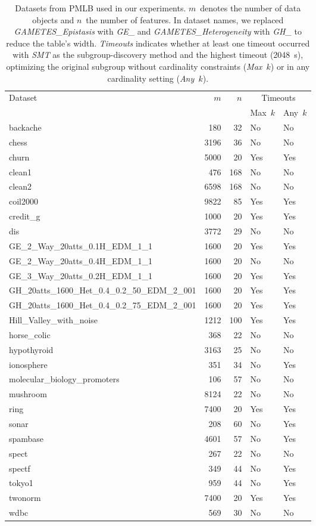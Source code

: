 \documentclass{article}
\theoremstyle{definition}
\begin{document}
\begin{table}[p]
	\centering
	\begin{tabular}{lrrll}
		\toprule
		\multirow{2}{*}{Dataset} & \multirow{2}{*}{$m$} & \multirow{2}{*}{$n$} & \multicolumn{2}{c}{Timeouts} \\
		\cmidrule(lr){4-5}
		& & & Max~$k$ & Any~$k$ \\
		\midrule
		backache & 180 & 32 & No & No \\
		chess & 3196 & 36 & No & No \\
		churn & 5000 & 20 & Yes & Yes \\
		clean1 & 476 & 168 & No & No \\
		clean2 & 6598 & 168 & No & No \\
		coil2000 & 9822 & 85 & Yes & Yes \\
		credit\_g & 1000 & 20 & Yes & Yes \\
		dis & 3772 & 29 & No & No \\
		GE\_2\_Way\_20atts\_0.1H\_EDM\_1\_1 & 1600 & 20 & Yes & Yes \\
		GE\_2\_Way\_20atts\_0.4H\_EDM\_1\_1 & 1600 & 20 & No & No \\
		GE\_3\_Way\_20atts\_0.2H\_EDM\_1\_1 & 1600 & 20 & Yes & Yes \\
		GH\_20atts\_1600\_Het\_0.4\_0.2\_50\_EDM\_2\_001 & 1600 & 20 & Yes & Yes \\
		GH\_20atts\_1600\_Het\_0.4\_0.2\_75\_EDM\_2\_001 & 1600 & 20 & Yes & Yes \\
		Hill\_Valley\_with\_noise & 1212 & 100 & Yes & Yes \\
		horse\_colic & 368 & 22 & No & No \\
		hypothyroid & 3163 & 25 & No & No \\
		ionosphere & 351 & 34 & No & Yes \\
		molecular\_biology\_promoters & 106 & 57 & No & No \\
		mushroom & 8124 & 22 & No & No \\
		ring & 7400 & 20 & Yes & Yes \\
		sonar & 208 & 60 & No & Yes \\
		spambase & 4601 & 57 & No & Yes \\
		spect & 267 & 22 & No & No \\
		spectf & 349 & 44 & No & Yes \\
		tokyo1 & 959 & 44 & No & Yes \\
		twonorm & 7400 & 20 & Yes & Yes \\
		wdbc & 569 & 30 & No & No \\
		\bottomrule
	\end{tabular}
	\caption{
		Datasets from PMLB used in our experiments.
		$m$~denotes the number of data objects and $n$~the number of features.
		In dataset names, we replaced \emph{GAMETES\_Epistasis} with  \emph{GE\_} and \emph{GAMETES\_Heterogeneity} with \emph{GH\_} to reduce the table's width.
		\emph{Timeouts} indicates whether at least one timeout occurred with \emph{SMT} as the subgroup-discovery method and the highest timeout (2048~s), optimizing the original subgroup without cardinality constraints (\emph{Max~$k$}) or in any cardinality setting (\emph{Any~$k$}).
	}
	\label{tab:csd:datasets}
\end{table}
\end{document}
